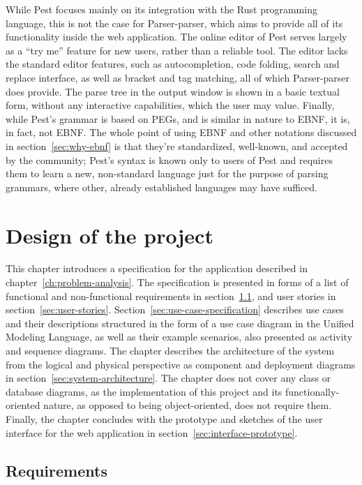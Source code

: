 \documentclass[english,engineering]{wizthesis}
\newcommand{\thisproject}{Parser-parser}
\begin{document}
While Pest focuses mainly on its integration with the Rust programming language,
this is not the case for \thisproject{}, which aims to provide all of its
functionality inside the web application. The online editor of Pest serves
largely as a ``try me'' feature for new users, rather than a reliable tool. The
editor lacks the standard editor features, such as autocompletion, code folding,
search and replace interface, as well as bracket and tag matching, all of which
\thisproject{} does provide. The parse tree in the output window is shown in a
basic textual form, without any interactive capabilities, which the user may
value. Finally, while Pest's grammar is based on PEGs, and is similar in nature
to EBNF, it is, in fact, not EBNF. The whole point of using EBNF and other
notations discussed in section~\ref{sec:why-ebnf} is that they're standardized,
well-known, and accepted by the community; Pest's syntax is known only to users
of Pest and requires them to learn a new, non-standard language just for the
purpose of parsing grammars, where other, already established languages may have
sufficed.

\chapter{Design of the project}

This chapter introduces a specification for the application described in
chapter~\ref{ch:problem-analysis}. The specification is presented in forms of a
list of functional and non-functional requirements in
section~\ref{sec:requirements}, and user stories in
section~\ref{sec:user-stories}. Section~\ref{sec:use-case-specification}
describes use cases and their descriptions structured in the form of a use case
diagram in the Unified Modeling Language, as well as their example scenarios,
also presented as activity and sequence diagrams. The chapter describes the
architecture of the system from the logical and physical perspective as
component and deployment diagrams in section~\ref{sec:system-architecture}. The
chapter does not cover any class or database diagrams, as the implementation of
this project and its functionally-oriented nature, as opposed to being
object-oriented, does not require them. Finally, the chapter concludes with the
prototype and sketches of the user interface for the web application in
section~\ref{sec:interface-prototype}.

\section{Requirements} \label{sec:requirements}
\end{document}
